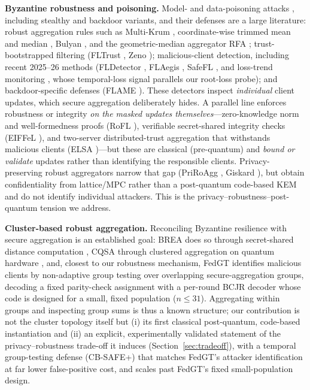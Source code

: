\documentclass[lettersize,journal]{IEEEtran}
\begin{document}
\textbf{Byzantine robustness and poisoning.} Model- and data-poisoning attacks
\cite{fang2020,shejwalkar2021,tolpegin2020}, including stealthy \cite{baruch2019}
and backdoor \cite{bagdasaryan2020,wangtails2020} variants, and their defenses are a
large literature: robust aggregation rules such as Multi-Krum \cite{blanchard2017},
coordinate-wise trimmed mean and median \cite{yin2018}, Bulyan \cite{bulyan}, and the
geometric-median aggregator RFA \cite{rfa}; trust-bootstrapped filtering
(FLTrust \cite{fltrust}, Zeno \cite{zeno}); malicious-client detection, including
recent 2025--26 methods (FLDetector \cite{fldetector2022}, FLAegis \cite{flaegis2025},
SafeFL \cite{safefl2025}, and loss-trend monitoring \cite{flltd2026}, whose
temporal-loss signal parallels our root-loss probe); and backdoor-specific defenses
(FLAME \cite{flame2022}). These detectors inspect \emph{individual} client updates,
which secure aggregation deliberately hides. A parallel line enforces robustness or
integrity \emph{on the masked updates themselves}---zero-knowledge norm and
well-formedness proofs (RoFL \cite{rofl}), verifiable secret-shared integrity checks
(EIFFeL \cite{eiffel}), and two-server distributed-trust aggregation that withstands
malicious clients (ELSA \cite{elsa})---but these are classical (pre-quantum) and
\emph{bound or validate} updates rather than identifying the responsible clients.
Privacy-preserving robust aggregators
narrow that gap (PriRoAgg \cite{priroagg2024}, Giskard \cite{giskard2026}), but obtain
confidentiality from lattice/MPC rather than a post-quantum code-based KEM and do not
identify individual attackers. This is the privacy--robustness--post-quantum tension we
address.

\textbf{Cluster-based robust aggregation.} Reconciling Byzantine resilience
with secure aggregation is an established goal: BREA does so through
secret-shared distance computation \cite{brea2021}, CQSA through clustered
aggregation on quantum hardware \cite{cqsa2026}, and, closest to our robustness
mechanism, FedGT \cite{fedgt} identifies malicious clients by non-adaptive group
testing \cite{dorfman1943,aldridge2019} over overlapping secure-aggregation groups,
decoding a fixed parity-check assignment with a per-round BCJR decoder whose code is
designed for a small, fixed population ($n{\le}31$). Aggregating within groups and
inspecting group sums is thus a known structure; our contribution is not the cluster
topology itself but (i) its first classical post-quantum, code-based
instantiation and (ii) an explicit, experimentally validated statement of the
privacy--robustness trade-off it induces (Section~\ref{sec:tradeoff}), with a
temporal group-testing defense (CB-SAFE+) that matches FedGT's attacker
identification at far lower false-positive cost, and scales past FedGT's fixed
small-population design.
\end{document}
